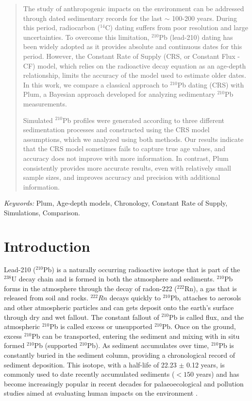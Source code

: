 \documentclass [10pt] {article}
\begin{document}
\begin{abstract}
The study of anthropogenic impacts on the environment can be addressed through dated sedimentary records for the last $\sim$ 100-200 years. During this period, radiocarbon ($^{14}$C) dating suffers from poor resolution and large uncertainties. To overcome this limitation, $^{210}$Pb (lead-210) dating has been widely adopted as it provides absolute and continuous dates for this period. However, the Constant Rate of Supply (CRS, or Constant Flux - CF) model, which relies on the radioactive decay equation as an age-depth relationship, limits the accuracy of the model used to estimate older dates. In this work, we compare a classical approach to $^{210}$Pb dating (CRS) with Plum, a Bayesian approach developed for analyzing sedimentary $^{210}$Pb measurements. 

Simulated $^{210}$Pb profiles were generated according to three different sedimentation processes and constructed using the CRS model assumptions, which we analyzed using both methods. Our results indicate that the CRS model sometimes fails to capture true age values, and accuracy does not improve with more information. In contrast, Plum consistently provides more accurate results, even with relatively small sample sizes, and improves accuracy and precision with additional information.\end{abstract}
	\noindent%
	{\it Keywords:} Plum, Age-depth models, Chronology, Constant Rate of Supply, Simulations, Comparison.
	\vfill
	\newpage

\section{Introduction}

	Lead-210 ($^{210}$Pb) is a naturally occurring radioactive isotope that is part of the $^{238}$U decay chain and is formed in both the atmosphere and sediments. $^{210}$Pb forms in the atmosphere through the decay of radon-222 ($^{222}$Rn), a gas that is released from soil and rocks. $^{222}Rn$ decays quickly to $^{210}$Pb, attaches to aerosols and other atmospheric particles and can gets deposit onto the earth's surface through dry and wet fallout. The constant fallout of $^{210}$Pb is called flux, and the atmospheric $^{210}$Pb is called excess or unsupported $^{210}$Pb. Once on the ground, excess $^{210}$Pb can be transported, entering the sediment and mixing with in situ formed $^{210}$Pb (supported $^{210}$Pb). As sediment accumulates over time, $^{210}$Pb is constantly buried in the sediment column, providing a chronological record of sediment deposition. This isotope, with a half-life of 22.23 $\pm$ 0.12 years, is commonly used to date recently accumulated sediments ($<150$ years) and has become increasingly popular in recent decades for palaeoecological and pollution studies aimed at evaluating human impacts on the environment \citep[e.g.,][]{Courtney2019}.
\end{document}
